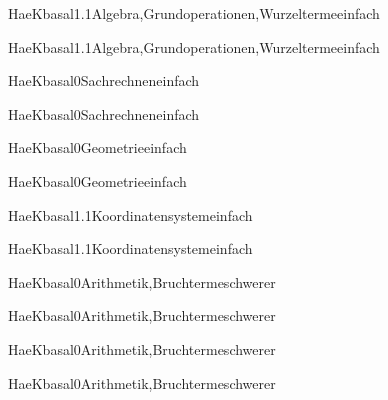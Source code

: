 \documentclass[12pt]{article}
\begin{document}
\begin{Add}{HaeK}{basal1.1}{Algebra,Grundoperationen,Wurzelterme}{einfach}
\solution{ }
\end{Add}
\begin{Add}{HaeK}{basal1.1}{Algebra,Grundoperationen,Wurzelterme}{einfach}
\end{Add}

\begin{Add}{HaeK}{basal0}{Sachrechnen}{einfach}
\solution{ }
\end{Add}
\begin{Add}{HaeK}{basal0}{Sachrechnen}{einfach}
\end{Add}

\begin{Add}{HaeK}{basal0}{Geometrie}{einfach}
\solution{ }
\end{Add}
\begin{Add}{HaeK}{basal0}{Geometrie}{einfach}
\end{Add}

\begin{Add}{HaeK}{basal1.1}{Koordinatensystem}{einfach}
\solution{ }
\end{Add}
\begin{Add}{HaeK}{basal1.1}{Koordinatensystem}{einfach}
\end{Add}

\begin{Add}{HaeK}{basal0}{Arithmetik,Bruchterme}{schwerer}
\solution{ }
\end{Add}
\begin{Add}{HaeK}{basal0}{Arithmetik,Bruchterme}{schwerer}
\end{Add}

\begin{Add}{HaeK}{basal0}{Arithmetik,Bruchterme}{schwerer}
\solution{ }
\end{Add}
\begin{Add}{HaeK}{basal0}{Arithmetik,Bruchterme}{schwerer}
\end{Add}
\end{document}
